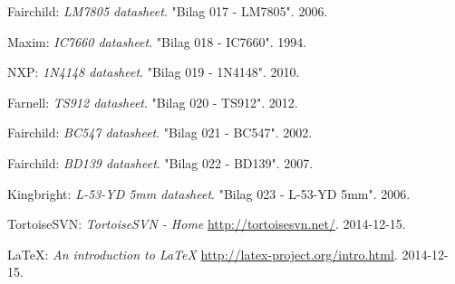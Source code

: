 \begin{thebibliography}{2}
 Fairchild: \textit{LM7805 datasheet}. "Bilag 017 - LM7805". 2006.

 Maxim: \textit{IC7660 datasheet}. "Bilag 018 - IC7660". 1994.

 NXP: \textit{1N4148 datasheet}. "Bilag 019 - 1N4148". 2010.

 Farnell: \textit{TS912 datasheet}. "Bilag 020 - TS912". 2012.

 Fairchild: \textit{BC547 datasheet}. "Bilag 021 - BC547". 2002.

 Fairchild: \textit{BD139 datasheet}. "Bilag 022 - BD139". 2007.

 Kingbright: \textit{L-53-YD 5mm datasheet}. "Bilag 023 - L-53-YD 5mm". 2006.

 TortoiseSVN: \textit{TortoiseSVN - Home} \url{http://tortoisesvn.net/}. 2014-12-15.

 LaTeX: \textit{An introduction to LaTeX} \url{http://latex-project.org/intro.html}. 2014-12-15.

\end{thebibliography}
